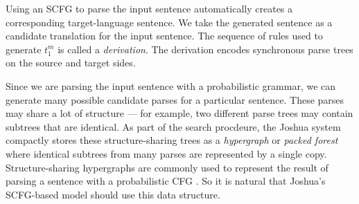 \documentclass[logo]{pbml}
\begin{document}
Using an SCFG to parse the input sentence automatically creates a corresponding target-language sentence.
We take the generated sentence as a candidate translation for the
input sentence. The sequence of rules used to generate $t_1^m$ is
called a {\it derivation}. The derivation encodes synchronous parse trees on
the source and target sides.



Since we are parsing the input sentence with a probabilistic grammar, we can
generate many possible candidate parses for a particular sentence. These parses
may share a lot of structure --- for example, two different parse trees may
contain subtrees that are identical. 
As part of the search procdeure, the Joshua system compactly stores 
these structure-sharing
trees as a {\em hypergraph} or {\em packed forest} where identical subtrees
from many parses are represented by a single copy.
Structure-sharing hypergraphs are commonly used to represent the result of
parsing a sentence with a probabilistic CFG \cite{billott-lang:1989:ACL,Klein2001}.
So it is natural that Joshua's
SCFG-based model should use this data structure.
\end{document}
